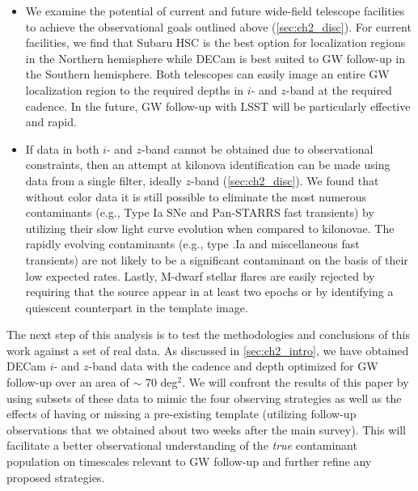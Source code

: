 \begin{itemize}
\item We examine the potential of current and future wide-field telescope facilities to achieve the observational goals outlined above (\cref{sec:ch2_disc}). For current facilities, we find that Subaru HSC is the best option for localization regions in the Northern hemisphere while DECam is best suited to GW follow-up in the Southern hemisphere. Both telescopes can easily image an entire GW localization region to the required depths in $i$- and $z$-band at the required cadence. In the future, GW follow-up with LSST will be particularly effective and rapid.
\item  If data in both $i$- and $z$-band cannot be obtained due to observational constraints, then an attempt at kilonova identification can be made using data from a single filter, ideally $z$-band (\cref{sec:ch2_disc}). We found that without color data it is still possible to eliminate the most numerous contaminants (e.g., Type Ia SNe and Pan-STARRS fast transients) by utilizing their slow light curve evolution when compared to kilonovae. The rapidly evolving contaminants (e.g., type .Ia and miscellaneous fast transients) are not likely to be a significant contaminant on the basis of their low expected rates. Lastly, M-dwarf stellar flares are easily rejected by requiring that the source appear in at least two epochs or by identifying a quiescent counterpart in the template image.
\end{itemize}

The next step of this analysis is to test the methodologies and conclusions of this work against a set of real data. As discussed in \cref{sec:ch2_intro}, we have obtained DECam $i$- and $z$-band data with the cadence and depth optimized for GW follow-up over an area of $\sim$ 70 deg$^2$. We will confront the results of this paper by using subsets of these data to mimic the four observing strategies as well as the effects of having or missing a pre-existing template (utilizing follow-up observations that we obtained about two weeks after the main survey). This will facilitate a better observational understanding of the {\em true} contaminant population on timescales relevant to GW follow-up and further refine any proposed strategies.

